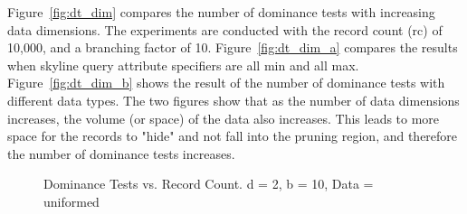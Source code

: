 Figure~\ref{fig:dt_dim} compares the number of dominance tests
with increasing data dimensions. The experiments are conducted
with the record count (rc) of 10,000, and a branching factor of
10. Figure~\ref{fig:dt_dim_a} compares the results when skyline
query attribute specifiers are all min and all max.
Figure~\ref{fig:dt_dim_b} shows the result of the number of
dominance tests with different data types. The two figures show
that as the number of data dimensions increases, the volume (or
space) of the data also increases. This leads to more space for
the records to "hide" and not fall into the pruning region, and
therefore the number of dominance tests increases.

\begin{figure}
  \centering
  \caption{\small Dominance Tests vs. Record Count. d = 2, b = 10,
  Data = uniformed}
  \label{fig:dt_rc}
\end{figure}


